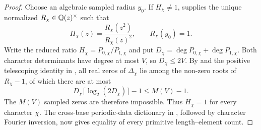 \begin{proof}
Choose an algebraic sampled radius \(y_0\).  If \(H_\chi\ne1\),
 supplies the unique normalized
\(R_\chi\in\mathbb{Q}(z)^\times\) such that
\[
 H_\chi(z)=\frac{R_\chi(z^2)}{R_\chi(z)^2},
 \qquad R_\chi(y_0)=1.
\]
Write the reduced ratio \(H_\chi=P_{0,\chi}/P_{1,\chi}\) and put
\(D_\chi=\deg P_{0,\chi}+\deg P_{1,\chi}\).  Both character determinants
have degree at most \(V\), so \(D_\chi\le2V\).  By
 and the positive telescoping
identity in , all real zeros of
\(\Delta_\chi\) lie among the non-zero roots of \(R_\chi-1\), of which there
are at most
\[
 D_\chi\lceil\log_2(2D_\chi)\rceil-1
 \le M(V)-1.
\]
The \(M(V)\) sampled zeros are therefore impossible.  Thus \(H_\chi=1\)
for every character \(\chi\).  The cross-base periodic-data dictionary in
, followed by character Fourier inversion,
now gives equality of every primitive length--element count.
\end{proof}

